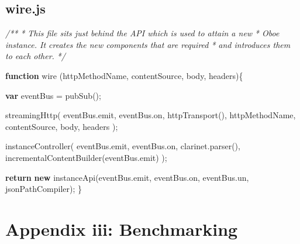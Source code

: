 \documentclass[12pt, ]{article}
\let\stdsection\section
\renewcommand\section{\newpage\stdsection}
\newenvironment{Shaded}{}{}
\newcommand{\KeywordTok}[1]{\textcolor[rgb]{0.00,0.44,0.13}{\textbf{{#1}}}}
\newcommand{\CommentTok}[1]{\textcolor[rgb]{0.38,0.63,0.69}{\textit{{#1}}}}
\newcommand{\OtherTok}[1]{\textcolor[rgb]{0.00,0.44,0.13}{{#1}}}
\newcommand{\FunctionTok}[1]{\textcolor[rgb]{0.02,0.16,0.49}{{#1}}}
\newcommand{\NormalTok}[1]{{#1}}
\begin{document}
\pagebreak

\subsection{wire.js}\label{headerux5fwire}

\label{src_wire}

\begin{Shaded}
\begin{Highlighting}[]
\CommentTok{/**}
\CommentTok{ * This file sits just behind the API which is used to attain a new}
\CommentTok{ * Oboe instance. It creates the new components that are required}
\CommentTok{ * and introduces them to each other.}
\CommentTok{ */}

\KeywordTok{function} \FunctionTok{wire} \NormalTok{(httpMethodName, contentSource, body, headers)\{}

   \KeywordTok{var} \NormalTok{eventBus = }\FunctionTok{pubSub}\NormalTok{();}
               
   \FunctionTok{streamingHttp}\NormalTok{( }\OtherTok{eventBus}\NormalTok{.}\FunctionTok{emit}\NormalTok{, }\OtherTok{eventBus}\NormalTok{.}\FunctionTok{on}\NormalTok{,}
                  \FunctionTok{httpTransport}\NormalTok{(), }
                  \NormalTok{httpMethodName, contentSource, body, headers );                              }
     
   \FunctionTok{instanceController}\NormalTok{( }
               \OtherTok{eventBus}\NormalTok{.}\FunctionTok{emit}\NormalTok{, }\OtherTok{eventBus}\NormalTok{.}\FunctionTok{on}\NormalTok{, }
               \OtherTok{clarinet}\NormalTok{.}\FunctionTok{parser}\NormalTok{(), }
               \FunctionTok{incrementalContentBuilder}\NormalTok{(}\OtherTok{eventBus}\NormalTok{.}\FunctionTok{emit}\NormalTok{) }
   \NormalTok{);}
      
   \KeywordTok{return} \KeywordTok{new} \FunctionTok{instanceApi}\NormalTok{(}\OtherTok{eventBus}\NormalTok{.}\FunctionTok{emit}\NormalTok{, }\OtherTok{eventBus}\NormalTok{.}\FunctionTok{on}\NormalTok{, }\OtherTok{eventBus}\NormalTok{.}\FunctionTok{un}\NormalTok{, jsonPathCompiler);}
\NormalTok{\}}
\end{Highlighting}
\end{Shaded}

\section{Appendix iii: Benchmarking}\label{appendix-iii-benchmarking}
\end{document}
